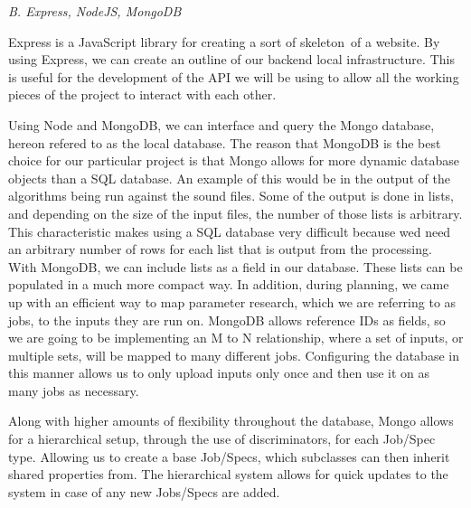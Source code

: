 \begin{flushleft}
\noindent\textit{B. Express, NodeJS, MongoDB}\par
Express is a JavaScript library for creating a sort of \textquotesingle skeleton\textquotesingle\ of a website. By using Express, we can create an outline of our backend local infrastructure. This is useful for the development of the API we will be using to allow all the working pieces of the project to interact with each other.\par
Using Node and MongoDB, we can interface and query the Mongo database, hereon refered to as the local database. The reason that MongoDB is the best choice for our particular project is that Mongo allows for more dynamic database objects than a SQL database. An example of this would be in the output of the algorithms being run against the sound files. Some of the output is done in lists, and depending on the size of the input files, the number of those lists is arbitrary. This characteristic makes using a SQL database very difficult because we\textquotesingle d need an arbitrary number of rows for each list that is output from the processing. With MongoDB, we can include lists as a field in our database. These lists can be populated in a much more compact way. In addition, during planning, we came up with an efficient way to map parameter research, which we are referring to as jobs, to the inputs they are run on. MongoDB allows reference IDs as fields, so we are going to be implementing an M to N relationship, where a set of inputs, or multiple sets, will be mapped to many different jobs. Configuring the database in this manner allows us to only upload inputs only once and then use it on as many jobs as necessary.\par
Along with higher amounts of flexibility throughout the database, Mongo allows for a hierarchical setup, through the use of discriminators, for each Job/Spec type. Allowing us to create a base Job/Specs, which subclasses can then inherit shared properties from. The hierarchical system allows for quick updates to the system in case of any new Jobs/Specs are added.

\end{flushleft}
